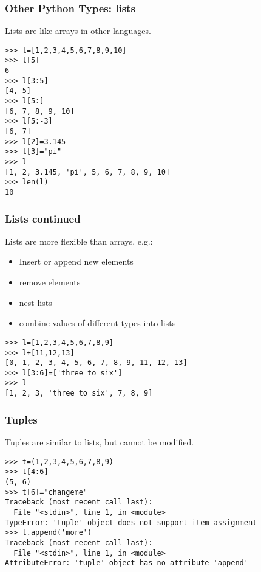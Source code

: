 \documentclass[10pt]{beamer}
\begin{document}
\begin{frame}[fragile]
\frametitle{Other Python Types: lists}

Lists are like arrays in other languages.  
\begin{verbatim}
>>> l=[1,2,3,4,5,6,7,8,9,10]
>>> l[5]
6
>>> l[3:5]
[4, 5]
>>> l[5:]
[6, 7, 8, 9, 10]
>>> l[5:-3]
[6, 7]
>>> l[2]=3.145
>>> l[3]="pi"
>>> l
[1, 2, 3.145, 'pi', 5, 6, 7, 8, 9, 10]
>>> len(l)
10
\end{verbatim}

\end{frame}

\begin{frame}[fragile]
\frametitle{Lists continued}

Lists are more flexible than arrays, e.g.:
\begin{itemize}
\item Insert or append new elements
\item remove elements
\item nest lists
\item combine values of different types into lists
\end{itemize}

\begin{verbatim}
>>> l=[1,2,3,4,5,6,7,8,9]
>>> l+[11,12,13]
[0, 1, 2, 3, 4, 5, 6, 7, 8, 9, 11, 12, 13]
>>> l[3:6]=['three to six']
>>> l
[1, 2, 3, 'three to six', 7, 8, 9]
\end{verbatim}

\end{frame}

\begin{frame}[fragile]
\frametitle{Tuples}

Tuples are similar to lists, but cannot be modified.
\begin{verbatim}
>>> t=(1,2,3,4,5,6,7,8,9)
>>> t[4:6]
(5, 6)
>>> t[6]="changeme"
Traceback (most recent call last):
  File "<stdin>", line 1, in <module>
TypeError: 'tuple' object does not support item assignment
>>> t.append('more')
Traceback (most recent call last):
  File "<stdin>", line 1, in <module>
AttributeError: 'tuple' object has no attribute 'append'
\end{verbatim}
\end{frame}
\end{document}
